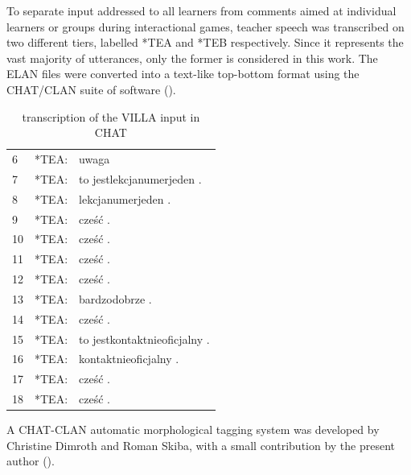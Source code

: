 To separate input addressed to all learners from comments aimed at individual learners or groups during interactional games, teacher speech was transcribed on two different tiers, labelled *TEA and *TEB respectively. Since it represents the vast majority of utterances, only the former is considered in this work. The ELAN files were converted into a text-like top-bottom format using the CHAT/CLAN \citep{MacWhinney2000} suite of software ().

\begin{table}
\ttfamily
    \begin{tabular}{lrl}
        6    &   *TEA: & uwaga\\
        7    &   *TEA: & to jestlekcjanumerjeden . \\
        8    &   *TEA: & lekcjanumerjeden .  \\
        9    &   *TEA: & cześć .  \\
        10   &   *TEA: & cześć .  \\
        11   &   *TEA: & cześć .  \\
        12   &   *TEA: & cześć .  \\
        13   &   *TEA: & bardzodobrze .  \\
        14   &   *TEA: & cześć .  \\
        15   &   *TEA: & to jestkontaktnieoficjalny .  \\
        16   &   *TEA: & kontaktnieoficjalny .  \\
        17   &   *TEA: & cześć .  \\
        18   &   *TEA: & cześć . \\
    \end{tabular}
    \caption{transcription of the VILLA input in CHAT}
    \label{fig:02:4}
\end{table}

A CHAT-CLAN automatic morphological tagging system was developed by Christine Dimroth and Roman Skiba, with a small contribution by the present author (). 


